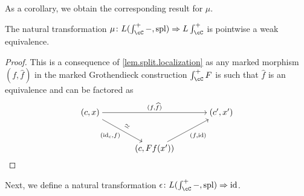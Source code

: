 \documentclass[11pt, dvipsnames]{amsart}
\begin{document}
As a corollary, we obtain the corresponding result for $\mu$.

\begin{cor}\label{split.counit.weak.equiv}
The natural transformation $\mu\colon L(\int_\cC^+ -,\mathrm{spl})\Rightarrow L\int_\cC^+$ is pointwise a weak equivalence.   
\end{cor}
\begin{proof}
    This is a consequence of \cref{lem.split.localization} as any marked morphism $(f,\widehat{f})$ in the marked Grothendieck construction $\int_\cC^+ F$ is such that $\widehat{f}$ is an equivalence and can be factored as
    \[\begin{tikzcd}[cramped,sep=scriptsize]
    	{(c,x)} && {} && {(c',x')} \\
    	\\
    	&& {(c,Ff(x'))}
    	\arrow["{(f,\widehat{f})}", from=1-1, to=1-5]
    	\arrow["{(\id_c,f)}"',"\mathrel{\rotatebox[origin=c]{-30}{$\simeq$}}", from=1-1, to=3-3]
    	\arrow["{(f,\id)}"', from=3-3, to=1-5]
    \end{tikzcd}\]
\end{proof}

Next, we define a natural transformation $\epsilon\colon L(\int_\cC^+  -,\mathrm{spl})\Rightarrow\id$.
\end{document}
